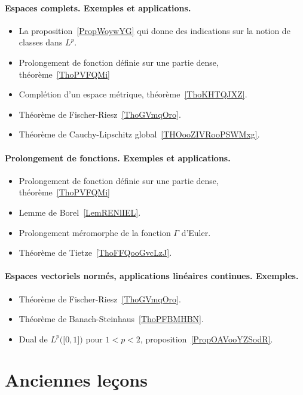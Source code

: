 \paragraph{Espaces complets. Exemples et applications.}
\begin{itemize}
    \item La proposition~\ref{PropWoywYG} qui donne des indications sur la notion de classes dans \( L^p\).
    \item Prolongement de fonction définie sur une partie dense, théorème~\ref{ThoPVFQMi}
    \item Complétion d'un espace métrique, théorème~\ref{ThoKHTQJXZ}.
    \item Théorème de Fischer-Riesz~\ref{ThoGVmqOro}.
    \item Théorème de Cauchy-Lipschitz global~\ref{THOooZIVRooPSWMxg}.
\end{itemize}
\paragraph{Prolongement de fonctions. Exemples et applications.}
\begin{itemize}
    \item Prolongement de fonction définie sur une partie dense, théorème~\ref{ThoPVFQMi}
    \item Lemme de Borel~\ref{LemRENlIEL}.
    \item Prolongement méromorphe de la fonction \( \Gamma\) d'Euler.
    \item Théorème de Tietze~\ref{ThoFFQooGvcLzJ}.
\end{itemize}
\paragraph{Espaces vectoriels normés, applications linéaires continues. Exemples.}
\begin{itemize}
    \item Théorème de Fischer-Riesz~\ref{ThoGVmqOro}.
    \item Théorème de Banach-Steinhaus~\ref{ThoPFBMHBN}.
    \item Dual de \( L^p\big( \mathopen[ 0 , 1 \mathclose] \big)\) pour \( 1<p<2\), proposition~\ref{PropOAVooYZSodR}.
\end{itemize}


\section{Anciennes leçons}

